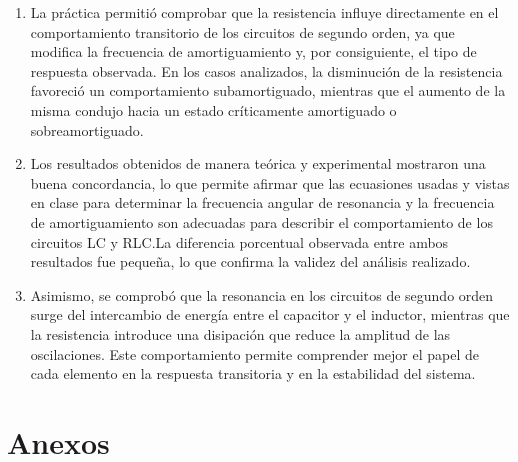 \documentclass{article}
\begin{document}
    \begin{enumerate}
        \item La práctica permitió comprobar que la resistencia influye directamente en el comportamiento transitorio de los circuitos de segundo orden, ya que modifica la frecuencia de amortiguamiento y, por consiguiente, el tipo de respuesta observada. En los casos analizados, la disminución de la resistencia favoreció un comportamiento subamortiguado, mientras que el aumento de la misma condujo hacia un estado críticamente amortiguado o sobreamortiguado.

        \item Los resultados obtenidos de manera teórica y experimental mostraron una buena concordancia, lo que permite afirmar que las ecuasiones usadas y vistas en clase para determinar la frecuencia angular de resonancia y la frecuencia de amortiguamiento son adecuadas para describir el comportamiento de los circuitos LC y RLC.\@ La diferencia porcentual observada entre ambos resultados fue pequeña, lo que confirma la validez del análisis realizado.

        \item Asimismo, se comprobó que la resonancia en los circuitos de segundo orden surge del intercambio de energía entre el capacitor y el inductor, mientras que la resistencia introduce una disipación que reduce la amplitud de las oscilaciones. Este comportamiento permite comprender mejor el papel de cada elemento en la respuesta transitoria y en la estabilidad del sistema.
    \end{enumerate}
    
    \nocite{*}
    \printbibliography{}

    \newpage
    \section{Anexos}

\end{document}
